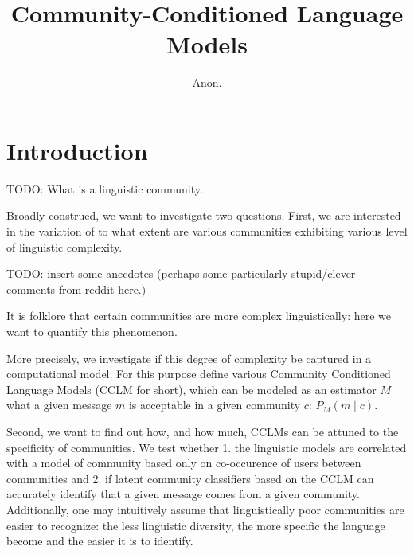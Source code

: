 \documentclass[11pt,a4paper]{article}
\title{Community-Conditioned Language Models}
\author{Anon.}
\date{}
\begin{document}
\maketitle
\begin{abstract}
\end{abstract}


\section{Introduction}


TODO: What is a linguistic community. 

Broadly construed, we want to investigate two questions.  First, we
are interested in the variation of to what extent are various
communities exhibiting various level of linguistic complexity.

TODO: insert some anecdotes (perhaps some particularly stupid/clever
comments from reddit here.)

It is folklore that certain communities are more complex
linguistically: here we want to quantify this phenomenon.

More precisely, we investigate if this degree of complexity be
captured in a computational model.  For this purpose define various
Community Conditioned Language Models (CCLM for short), which can be
modeled as an estimator $M$ what a given message $m$ is acceptable in
a given community $c$: \(P_M(m \mid c)\).

Second, we want to find out how, and how much, CCLMs can be attuned to
the specificity of communities. We test whether 1. the linguistic
models are correlated with a model of community based only on
co-occurence of users between communities and 2. if latent community
classifiers based on the CCLM can accurately identify that a given
message comes from a given community. Additionally, one may
intuitively assume that linguistically poor communities are easier to
recognize: the less linguistic diversity, the more specific the
language become and the easier it is to identify.
\end{document}
